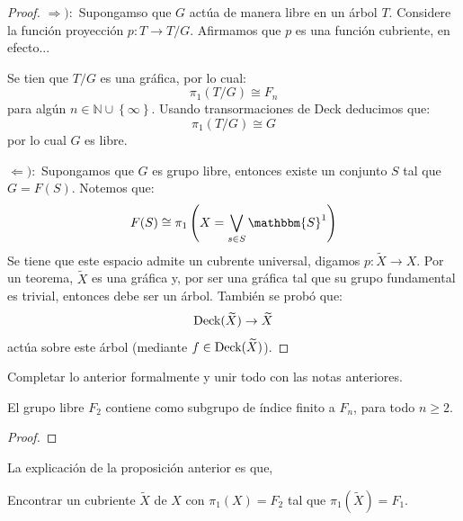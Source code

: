 \documentclass[12pt]{report}
\newcounter{it}
\theoremstyle{largebreak}
\newcommand\cf[3]{\ensuremath{#1:#2\rightarrow#3}}
\newcommand{\bbm}[1]{\ensuremath{\mathbbm{#1}}}
\begin{document}
    \begin{proof}
        $\Rightarrow):$ Supongamso que $G$ actúa de manera libre en un árbol $T$. Considere la función proyección $\cf{p}{T}{T/G}$. Afirmamos que $p$ es una función cubriente, en efecto...

        Se tien que $T/G$ es una gráfica, por lo cual:
        \begin{equation*}
            \pi_1(T/G)\cong F_n
        \end{equation*}
        para algún $n\in\mathbb{N}\cup\left\{\infty\right\}$. Usando transormaciones de Deck deducimos que:
        \begin{equation*}
            \pi_1(T/G)\cong G
        \end{equation*}
        por lo cual $G$ es libre.

        $\Leftarrow):$ Supongamos que $G$ es grupo libre, entonces existe un conjunto $S$ tal que $G=F(S)$. Notemos que:
        \begin{equation*}
            F(S)\cong\pi_1\left(X=\bigvee_{ s\in S}\bbm{S}^1 \right)
        \end{equation*}
        Se tiene que este espacio admite un cubrente universal, digamos $\cf{p}{\widetilde{X}}{X}$. Por un teorema, $\widetilde{X}$ es una gráfica y, por ser una gráfica tal que su grupo fundamental es trivial, entonces debe ser un árbol. También se probó que:
        \begin{equation*}
            \textup{Deck}(\widetilde{X})\rightarrow\widetilde{X}
        \end{equation*}
        actúa sobre este árbol (mediante $f\in\textup{Deck}(\widetilde{X})$).
    \end{proof}

    \begin{obs}
        Completar lo anterior formalmente y unir todo con las notas anteriores.
    \end{obs}

    \begin{propo}
        El grupo libre $F_2$ contiene como subgrupo de índice finito a $F_n$, para todo $n\geq2$.
    \end{propo}

    \begin{proof}
        
    \end{proof}

    La explicación de la proposición anterior es que, 

    \begin{excer}
        Encontrar un cubriente $\widetilde{X}$ de $X$ con $\pi_1(X)=F_2$ tal que $\pi_1(\widetilde{X})=F_1$.
    \end{excer}
\end{document}
